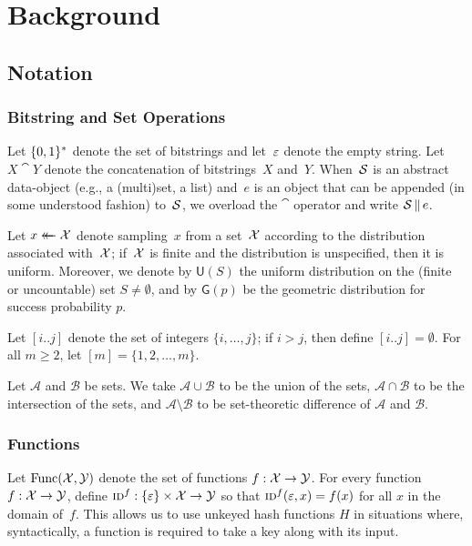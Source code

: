 \chapter{Background}\label{chap:background}

\section{Notation}

\subsection{Bitstring and Set Operations}

Let $\{0,1\}^*$ denote the set of bitstrings and let~$\varepsilon$ denote the empty
string. Let $X \cat Y$ denote the concatenation of bitstrings~$X$ and~$Y$.  When~$\mathcal{S}$ is an abstract data-object (e.g., a (multi)set, a list) and~$e$ is an object that can be appended (in some understood fashion) to~$\mathcal{S}$, we overload the $\cat$ operator and write $\mathcal{S} \, \| \, e$.

Let $x \mathrel{\leftarrow\mkern-14mu\leftarrow} \mathcal{X}$ denote sampling~$x$ from a set~$\mathcal{X}$ according to the distribution associated with~$\mathcal{X}$; if~$\mathcal{X}$ is finite and the distribution is unspecified, then it is uniform. Moreover, we denote by $\mathsf{U}(S)$ the uniform distribution on the (finite or uncountable) set $S\neq\emptyset$, and by $\mathsf{G}(p)$ be the geometric distribution for success probability $p$.

Let $[i..j]$ denote the set of integers $\{i, \ldots, j\}$; if $i > j$, then define $[i..j] = \emptyset$. For all $m \geq 2$, let $[m] = \{1,2,\ldots,m\}$.

Let $\mathcal{A}$ and $\mathcal{B}$ be sets. We take $\mathcal{A} \cup \mathcal{B}$ to be the union of the sets, $\mathcal{A} \cap \mathcal{B}$ to be the intersection of the sets, and $\mathcal{A} \setminus \mathcal{B}$ to be set-theoretic difference of $\mathcal{A}$ and $\mathcal{B}$.

\subsection{Functions}

Let $\mathrm{Func}(\mathcal{X},\mathcal{Y})$ denote the set of functions $f:\mathcal{X}\to\mathcal{Y}$. For every function~$f: \mathcal{X} \to \mathcal{Y}$, define $\textnormal{\textsc{id}}^f: \{\varepsilon\} \times \mathcal{X} \to \mathcal{Y}$ so that $\textnormal{\textsc{id}}^f(\varepsilon, x) = f(x)$ for all $x$ in the domain of~$f$. This allows us to use unkeyed hash functions $H$ in situations where, syntactically, a function is required to take a key along with its input. 


